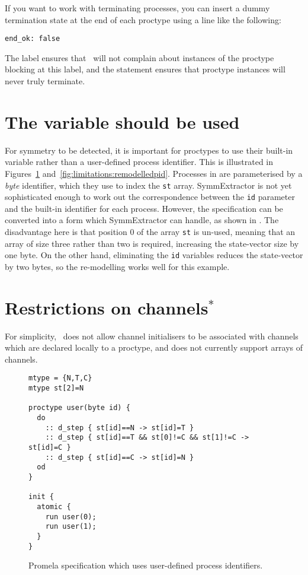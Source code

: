 If you want to work with terminating processes, you can insert a dummy termination state at the end of each proctype using
a line like the following:

\begin{lstlisting}
end_ok: false
\end{lstlisting}

The  label ensures that \spin\ will not complain about instances of the proctype blocking at this label,
and the  statement ensures that proctype instances will never truly terminate.

\section{The \protect{} variable should be used}

For symmetry to be detected, it is important for proctypes to use
their built-in  variable rather than a user-defined
process identifier.  This is illustrated in
Figures~\ref{fig:limitations:originalpid}
and~\ref{fig:limitations:remodelledpid}. Processes in
 are parameterised by a
{\it byte} identifier, which they use to index the \texttt{st}
array. SymmExtractor is not yet sophisticated enough to work out the
correspondence between the \texttt{id} parameter and the built-in
identifier for each process.  However, the specification can be
converted into a form which SymmExtractor can handle, as shown in
. The disadvantage
here is that position 0 of the array \texttt{st} is un-used, meaning
that an array of size three rather than two is required, increasing
the state-vector size by one byte. On the other hand, eliminating
the \texttt{id} variables reduces the state-vector by two bytes, so
the re-modelling works well for this example.

\section{Restrictions on channels$^\ast$}
For simplicity, \topspin\ does not allow channel initialisers to be associated
with channels which are declared locally to a proctype, and does not currently
support arrays of channels.

\begin{figure}
\begin{scriptsize}
\begin{verbatim}
mtype = {N,T,C}
mtype st[2]=N

proctype user(byte id) {
  do
    :: d_step { st[id]==N -> st[id]=T }
    :: d_step { st[id]==T && st[0]!=C && st[1]!=C -> st[id]=C }
    :: d_step { st[id]==C -> st[id]=N }
  od
}

init {
  atomic {
    run user(0);
    run user(1);
  }
}
\end{verbatim}
\end{scriptsize}
\caption{Promela specification which uses user-defined process
identifiers.}\label{fig:limitations:originalpid}
\end{figure}

